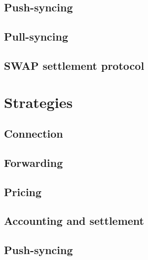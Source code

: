 \section{Push-syncing  \statusorange  \statuspriority}\label{spec:protocol:push-sync}


\section{Pull-syncing \statusorange  \statuspriority}\label{spec:protocol:pull-sync}


\section{SWAP settlement protocol \statusorange}\label{spec:protocol:swap}


\chapter{Strategies \statusorange}\label{spec:strategy}

\section{Connection  \statusorange}\label{spec:strategy:connection}
%

\section{Forwarding  \statusorange}\label{spec:strategy:forwarding}


\section{Pricing  \statusorange}\label{spec:strategy:pricing}


\section{Accounting and settlement  \statusorange}\label{spec:strategy:swap}


\section{Push-syncing  \statusorange}\label{spec:strategy:push-sync}


